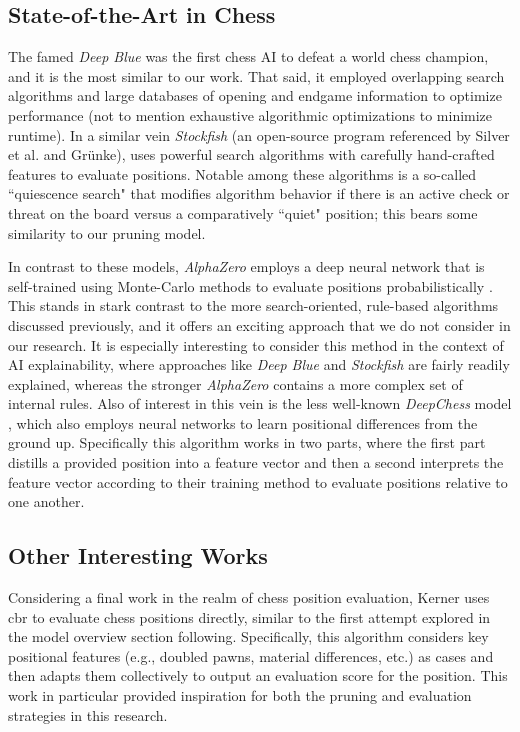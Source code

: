 \documentclass[letterpaper]{article}
\begin{document}
\subsection{State-of-the-Art in Chess}
The famed \textit{Deep Blue} \cite{campbell-et-al2002} was the first chess AI to defeat a world chess champion, and it is the most similar to our work.  That said, it employed overlapping search algorithms and large databases of opening and endgame information to optimize performance (not to mention exhaustive algorithmic optimizations to minimize runtime).  In a similar vein \textit{Stockfish} (an open-source program referenced by Silver et al. and Grünke), uses powerful search algorithms with carefully hand-crafted features to evaluate positions.  Notable among these algorithms is a so-called ``quiescence search" that modifies algorithm behavior if there is an active check or threat on the board versus a comparatively ``quiet" position; this bears some similarity to our pruning model.

In contrast to these models, \textit{AlphaZero} employs a deep neural network that is self-trained using Monte-Carlo methods to evaluate positions probabilistically \cite{silver-et-al17}.  This stands in stark contrast to the more search-oriented, rule-based algorithms discussed previously, and it offers an exciting approach that we do not consider in our research.  It is especially interesting to consider this method in the context of AI explainability, where approaches like \textit{Deep Blue} and \textit{Stockfish} are fairly readily explained, whereas the stronger \textit{AlphaZero} contains a more complex set of internal rules.  Also of interest in this vein is the less well-known \textit{DeepChess} model \cite{david-et-al2016}, which also employs neural networks to learn positional differences from the ground up.   Specifically this algorithm works in two parts, where the first part distills a provided position into a feature vector and then a second interprets the feature vector according to their training method to evaluate positions relative to one another.

\subsection{Other Interesting Works}
Considering a final work in the realm of chess position evaluation, Kerner \cite{Kerner94} uses \acrshort{cbr} to evaluate chess positions directly, similar to the first attempt explored in the model overview section following.  Specifically, this algorithm considers key positional features (e.g., doubled pawns, material differences, etc.) as cases and then adapts them collectively to output an evaluation score for the position.  This work in particular provided inspiration for both the pruning and evaluation strategies in this research.
\end{document}
